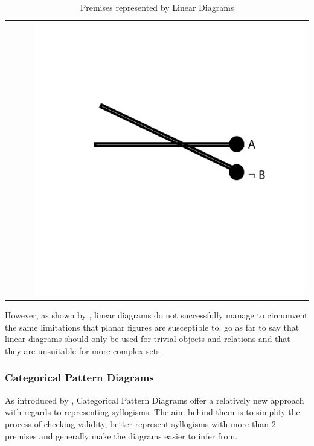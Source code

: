 \documentclass[12pt,a4paper]{report}
\begin{document}
\begin{table}[h!]
\begin{tabular}{  c  c  c  c }
\begin{minipage}{.22\textwidth}
    \end{minipage}
    \\
    &
     &
     &
    \begin{minipage}{.22\textwidth}
      \includegraphics[width=\textwidth]{O2Linear}
    \end{minipage}
    \\
  \end{tabular}
  \caption{Premises represented by Linear Diagrams}\label{tbl:linearPremises}
\end{table}
\FloatBarrier

However, as shown by \cite{lemon1998insufficiency}, linear diagrams do not successfully manage to circumvent the same limitations that planar figures are susceptible to. \cite{lemon1998insufficiency} go as far to say that linear diagrams should only be used for trivial objects and relations and that they are unsuitable for more complex sets.

\subsubsection{Categorical Pattern Diagrams}
As introduced by \cite{cheng2012visualizing}, Categorical Pattern Diagrams offer a relatively new approach with regards to representing syllogisms. The aim behind them is to simplify the process of checking validity, better represent syllogisms with more than 2 premises and generally make the diagrams easier to infer from.
\end{document}
